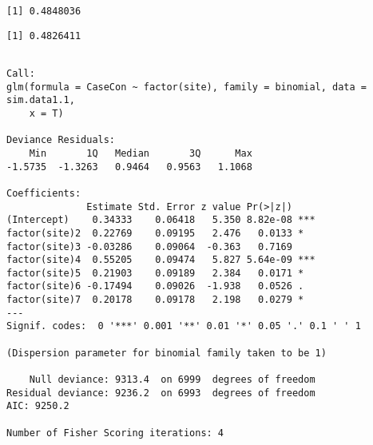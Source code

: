 \documentclass[12pt,twoside]{dukestatscithesis}
\theoremstyle{definition}
\theoremstyle{definition}
\theoremstyle{definition}
\theoremstyle{remark}
\begin{document}
\begin{verbatim}
[1] 0.4848036
\end{verbatim}
\begin{Shaded}
\begin{Highlighting}[]
\OperatorTok{$}\OperatorTok{$}\OperatorTok{$}
\end{Highlighting}
\end{Shaded}
\begin{verbatim}
[1] 0.4826411
\end{verbatim}
\begin{Shaded}
\begin{Highlighting}[]
\NormalTok{ =}\StringTok{ }\OperatorTok{~}\StringTok{ }

\NormalTok{)}
\end{Highlighting}
\end{Shaded}
\begin{verbatim}

Call:
glm(formula = CaseCon ~ factor(site), family = binomial, data = sim.data1.1, 
    x = T)

Deviance Residuals: 
    Min       1Q   Median       3Q      Max  
-1.5735  -1.3263   0.9464   0.9563   1.1068  

Coefficients:
              Estimate Std. Error z value Pr(>|z|)    
(Intercept)    0.34333    0.06418   5.350 8.82e-08 ***
factor(site)2  0.22769    0.09195   2.476   0.0133 *  
factor(site)3 -0.03286    0.09064  -0.363   0.7169    
factor(site)4  0.55205    0.09474   5.827 5.64e-09 ***
factor(site)5  0.21903    0.09189   2.384   0.0171 *  
factor(site)6 -0.17494    0.09026  -1.938   0.0526 .  
factor(site)7  0.20178    0.09178   2.198   0.0279 *  
---
Signif. codes:  0 '***' 0.001 '**' 0.01 '*' 0.05 '.' 0.1 ' ' 1

(Dispersion parameter for binomial family taken to be 1)

    Null deviance: 9313.4  on 6999  degrees of freedom
Residual deviance: 9236.2  on 6993  degrees of freedom
AIC: 9250.2

Number of Fisher Scoring iterations: 4
\end{verbatim}
\end{document}
